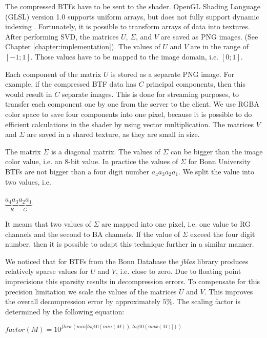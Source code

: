  
The compressed BTFs  have to be sent to the shader. 
  OpenGL Shading Language (GLSL) version 1.0 supports uniform arrays, but does not fully support dynamic indexing  \cite{glsl}.
Fortunately, it is possible to transform arrays of data into textures. 
After performing SVD, the matrices $U$, $\Sigma$, and $V$ are saved as PNG images. (See Chapter \ref{chapter:implementation}).
The values of $U$ and $V$ are in the range of $[-1;1]$.
 Those values have to be mapped to the image domain, i.e. $[0;1]$.

 Each component of the matrix $U$ is stored as a separate PNG image.
 For example, if the compressed BTF data has $C$ principal components, then this would result in $C$ separate images.
 This is done for streaming purposes, to transfer each component one by one from the server to the client.
 We use  RGBA color space to save four components into one pixel, because it is possible to do efficient calculations in the shader by using vector multiplication.
The matrices $V$ and $\Sigma$ are saved in a shared texture, as they are small in size.

 The matrix $\Sigma$ is a diagonal matrix.
 The values of $\Sigma$ can be bigger than the image color value, i.e. an 8-bit value.
 In practice the values of $\Sigma$ for Bonn University BTFs \cite{btfBonn} are not bigger than a four digit number $a_{4}a_{3}a_{2}a_{1}$.
We split the value into two values, i.e. 
 
{\centering$ \underbrace{a_{4}a_{3}}_{R} \underbrace{a_{2}a_{1}}_{G}$\\}
 
It means that two values of $\Sigma$ are mapped into one pixel, i.e.  one value to RG  channels and the second to BA channels.
If the value of  $\Sigma$ exceed the four digit number, then it is possible to adapt this technique further in a similar manner.


We noticed that for BTFs from the Bonn Database \cite{btfBonn} the \emph{jblas} \cite{jblas} library produces relatively sparse values for $U$ and $V$, i.e. close to zero.
 Due to floating point imprecisions this sparsity results in decompression errors.
 To compensate for this precision limitation we scale the values of the matrices $U$ and $V$.
 This improves the overall decompression error by  approximately $5\%$.
 The scaling factor is determined by the following equation:
 
 {\centering$ factor(M)=10^{floor(min[log10(min(M)),log10(max(M)]))}$ \\}
 
